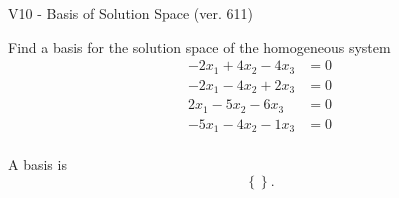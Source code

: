 \begin{exercise}
  \begin{exerciseTitle}V10 - Basis of Solution Space (ver. 611)\end{exerciseTitle}
  \begin{exerciseStatement}
    Find a basis for the solution space of the homogeneous system 
\begin{align*}
 -2 x_ 1 + 4 x_ 2 -4 x_ 3 &= 0  \\ 
  -2 x_ 1 -4 x_ 2 + 2 x_ 3 &= 0  \\ 
  2 x_ 1 -5 x_ 2 -6 x_ 3 &= 0  \\ 
  -5 x_ 1 -4 x_ 2 -1 x_ 3 &= 0  \\ 
 \end{align*}


 
  \end{exerciseStatement}

  \begin{exerciseAnswer}
   A basis is   
\[\left\{\right\}.\]

  


  \end{exerciseAnswer}
\end{exercise}
